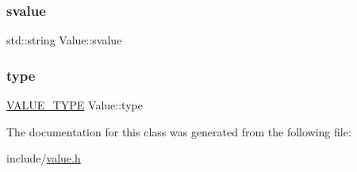 \mbox{\label{classValue_a033edf7ba7f753cf274565fac27f9c7d}} 
\subsubsection{\texorpdfstring{svalue}{svalue}}
{\footnotesize\ttfamily std\+::string Value\+::svalue}

\mbox{\label{classValue_a4ee4412ce2c7b78bad42d8eb93294bea}} 
\subsubsection{\texorpdfstring{type}{type}}
{\footnotesize\ttfamily \hyperlink{statics_8h_a0674a913b8e8c8a9f265baab3646b565}{V\+A\+L\+U\+E\+\_\+\+T\+Y\+PE} Value\+::type}



The documentation for this class was generated from the following file\+:\begin{DoxyCompactItemize}
\item 
include/\hyperlink{value_8h}{value.\+h}\end{DoxyCompactItemize}
